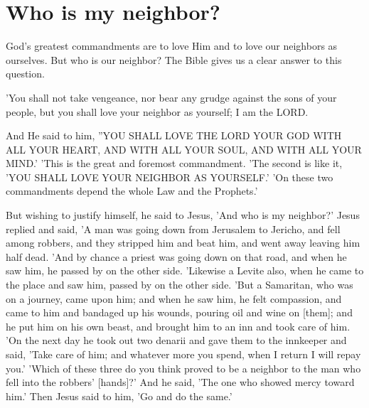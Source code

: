 \chapter{Who is my neighbor?}

God's greatest commandments are to love Him and to love our neighbors as ourselves. But who is our neighbor? The Bible gives us a clear answer to this question.

\begin{scripture}[Leviticus 19:18]
    'You shall not take vengeance, nor bear any grudge against the sons of your people, but you shall love your neighbor as yourself; I am the LORD.
\end{scripture}

\vspace{2\baselineskip}

\begin{scripture}[Matthew 22:37-40]
    And He said to him, ''YOU SHALL LOVE THE LORD YOUR GOD WITH ALL YOUR HEART, AND WITH ALL YOUR SOUL, AND WITH ALL YOUR MIND.'
    'This is the great and foremost commandment.
    'The second is like it, 'YOU SHALL LOVE YOUR NEIGHBOR AS YOURSELF.'
    'On these two commandments depend the whole Law and the Prophets.'
\end{scripture}

\vspace{2\baselineskip}

\begin{scripture}[Luke 10:29-37]
    But wishing to justify himself, he said to Jesus, 'And who is my neighbor?'
    Jesus replied and said, 'A man was going down from Jerusalem to Jericho, and fell among robbers, and they stripped him and beat him, and went away leaving him half dead.
    'And by chance a priest was going down on that road, and when he saw him, he passed by on the other side.
    'Likewise a Levite also, when he came to the place and saw him, passed by on the other side.
    'But a Samaritan, who was on a journey, came upon him; and when he saw him, he felt compassion,
    and came to him and bandaged up his wounds, pouring oil and wine on [them]; and he put him on his own beast, and brought him to an inn and took care of him.
    'On the next day he took out two denarii and gave them to the innkeeper and said, 'Take care of him; and whatever more you spend, when I return I will repay you.'
    'Which of these three do you think proved to be a neighbor to the man who fell into the robbers' [hands]?'
    And he said, 'The one who showed mercy toward him.' Then Jesus said to him, 'Go and do the same.'
\end{scripture}

